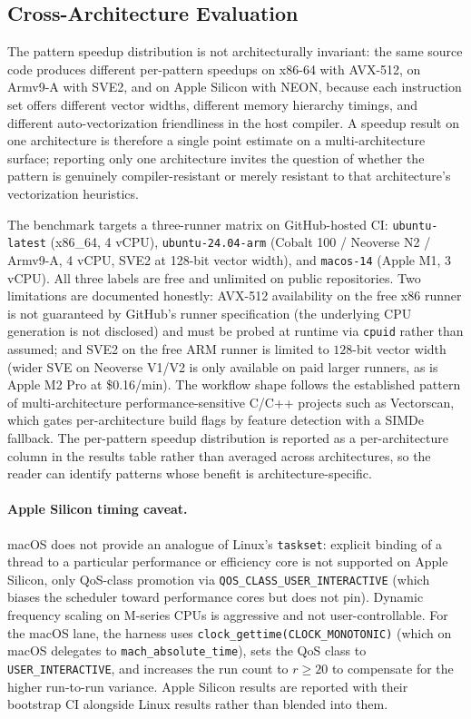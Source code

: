 \subsection{Cross-Architecture Evaluation}\label{subsec:multiarch}

The pattern speedup distribution is not architecturally invariant: the same source code produces different per-pattern speedups on x86-64 with AVX-512, on Armv9-A with SVE2, and on Apple Silicon with NEON, because each instruction set offers different vector widths, different memory hierarchy timings, and different auto-vectorization friendliness in the host compiler. A speedup result on one architecture is therefore a single point estimate on a multi-architecture surface; reporting only one architecture invites the question of whether the pattern is genuinely compiler-resistant or merely resistant to that architecture's vectorization heuristics.

The benchmark targets a three-runner matrix on GitHub-hosted CI: \texttt{ubuntu-latest} (x86\_64, 4 vCPU), \texttt{ubuntu-24.04-arm} (Cobalt 100 / Neoverse N2 / Armv9-A, 4 vCPU, SVE2 at 128-bit vector width), and \texttt{macos-14} (Apple M1, 3 vCPU). All three labels are free and unlimited on public repositories. Two limitations are documented honestly: AVX-512 availability on the free x86 runner is not guaranteed by GitHub's runner specification (the underlying CPU generation is not disclosed) and must be probed at runtime via \texttt{cpuid} rather than assumed; and SVE2 on the free ARM runner is limited to $128$-bit vector width (wider SVE on Neoverse V1/V2 is only available on paid larger runners, as is Apple M2 Pro at \$0.16/min). The workflow shape follows the established pattern of multi-architecture performance-sensitive C/C++ projects such as Vectorscan, which gates per-architecture build flags by feature detection with a SIMDe fallback. The per-pattern speedup distribution is reported as a per-architecture column in the results table rather than averaged across architectures, so the reader can identify patterns whose benefit is architecture-specific.

\paragraph{Apple Silicon timing caveat.} macOS does not provide an analogue of Linux's \texttt{taskset}: explicit binding of a thread to a particular performance or efficiency core is not supported on Apple Silicon, only QoS-class promotion via \texttt{QOS\_CLASS\_USER\_INTERACTIVE} (which biases the scheduler toward performance cores but does not pin). Dynamic frequency scaling on M-series CPUs is aggressive and not user-controllable. For the macOS lane, the harness uses \texttt{clock\_gettime(CLOCK\_MONOTONIC)} (which on macOS delegates to \texttt{mach\_absolute\_time}), sets the QoS class to \texttt{USER\_INTERACTIVE}, and increases the run count to $r \geq 20$ to compensate for the higher run-to-run variance. Apple Silicon results are reported with their bootstrap CI alongside Linux results rather than blended into them.

